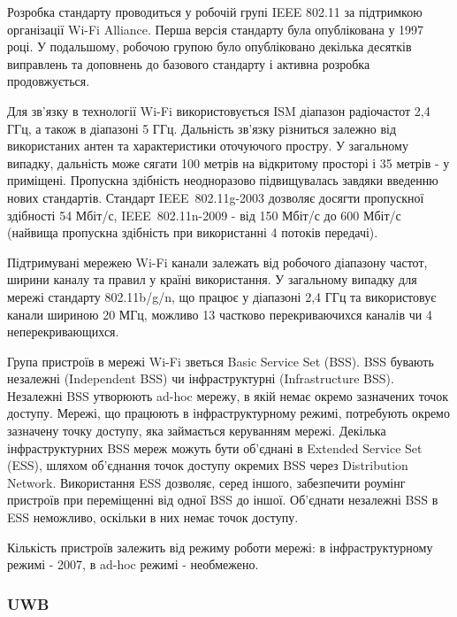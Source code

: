 \documentclass[a4paper,ukrainian,utf8,nocolumnsxix,floatsection,equationsection]{eskdtext}
\renewcommand\paragraph{\subsubsection}
\newcommand{\todoi}[1]{\todo[inline]{#1}}
\newcommand{\engtxt}[1]{\foreignlanguage{english}{#1}}
\begin{document}
Розробка стандарту проводиться у робочій групі IEEE 802.11 за підтримкою організації Wi-Fi Alliance. Перша версія стандарту була опублікована у 1997 році. У подальшому, робочою групою було опубліковано декілька десятків виправлень та доповнень до базового стандарту і активна розробка продовжується.

Для зв’язку в технології Wi-Fi використовується ISM діапазон радіочастот 2,4 ГГц, а також в діапазоні 5 ГГц. Дальність зв’язку різниться залежно від використаних антен та характеристики оточуючого простру. У загальному випадку, дальність може сягати 100 метрів на відкритому просторі і 35 метрів - у приміщені. Пропускна здібність неодноразово підвищувалась завдяки введенню нових стандартів. Стандарт IEEE~802.11g-2003 дозволяє досягти пропускної здібності 54 Мбіт/с, IEEE~802.11n-2009 - від 150 Мбіт/с до 600 Мбіт/с (найвища пропускна здібність при використанні 4 потоків передачі). 

Підтримувані мережею Wi-Fi канали залежать від робочого діапазону частот, ширини каналу та правил у країні використання. У загальному випадку для мережі стандарту 802.11b/g/n, що працює у діапазоні 2,4 ГГц та використовує канали шириною 20 МГц, можливо 13 частково перекриваючихся каналів чи 4 неперекривающихся. 

\todoi{image channels}

Група пристроїв в мережі Wi-Fi зветься \engtxt{Basic Service Set} (BSS). BSS бувають незалежні (\engtxt{Independent BSS}) чи інфраструктурні (\engtxt{Infrastructure BSS}). Незалежні BSS утворюють ad-hoc мережу, в якій немає окремо зазначених точок доступу. Мережі, що працюють в інфраструктурному режимі, потребують окремо зазначену точку доступу, яка займається керуванням мережі. Декілька інфраструктурних BSS мереж можуть бути об’єднані в \engtxt{Extended Service Set} (ESS), шляхом об’єднання точок доступу окремих BSS через \engtxt{Distribution Network}. Використання ESS дозволяє, серед іншого, забезпечити роумінг пристроїв при переміщенні від одної BSS до іншої. Об’єднати незалежні BSS в ESS неможливо, оскільки в них немає точок доступу.

Кількість пристроїв залежить від режиму роботи мережі: в інфраструктурному режимі - 2007, в ad-hoc режимі - необмежено.


\paragraph{UWB} %
\label{par:uwb}
\end{document}
